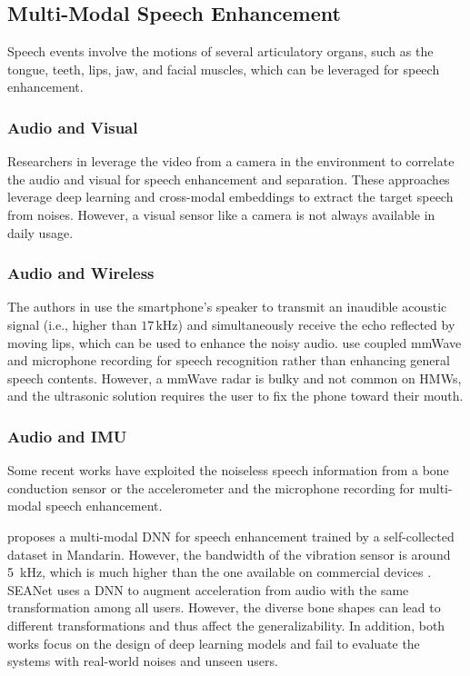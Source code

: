 \subsection{Multi-Modal Speech Enhancement}
Speech events involve the motions of several articulatory organs, such as the tongue, teeth, lips, jaw, and facial muscles, which can be leveraged for speech enhancement.

\subsubsection{Audio and Visual}
Researchers in \citep{michelsanti2021overview, gao2021visualvoice} leverage the video from a camera in the environment to correlate the audio and visual for speech enhancement and separation. 
These approaches leverage deep learning and cross-modal embeddings to extract the target speech from noises. However, a visual sensor like a camera is not always available in daily usage. 

\subsubsection{Audio and Wireless}
The authors in \citep{sun2021ultrase, zhang2021sensing} use the smartphone's speaker to transmit an inaudible acoustic signal (i.e., higher than $17\,\text{kHz}$) and simultaneously receive the echo reflected by moving lips, which can be used to enhance the noisy audio. 
\citep{liu2021wavoice, ozturk2021radiomic} use coupled mmWave and microphone recording for speech recognition rather than enhancing general speech contents. However, a mmWave radar is bulky and not common on HMWs, and the ultrasonic solution requires the user to fix the phone toward their mouth.

\subsubsection{Audio and IMU}
\label{subsubsec:related-audio-imu}
Some recent works have exploited the noiseless speech information from a bone conduction sensor or the accelerometer and the microphone recording for multi-modal speech enhancement. 

\citep{wang2022fusing} proposes a multi-modal DNN for speech enhancement trained by a self-collected dataset in Mandarin. However, the bandwidth of the vibration sensor is around 5~kHz, which is much higher than the one available on commercial devices \citep{Inertial63:online}.
SEANet \citep{tagliasacchi2020seanet} uses a DNN to augment acceleration from audio with the same transformation among all users. However, the diverse bone shapes can lead to different transformations and thus affect the generalizability. 
In addition, both works \citep{wang2022fusing, tagliasacchi2020seanet} focus on the design of deep learning models and fail to evaluate the systems with real-world noises and unseen users.

